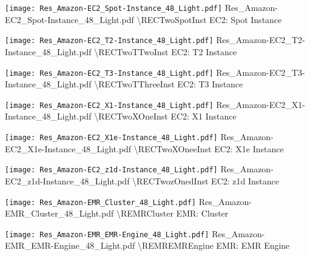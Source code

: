  {\texttt{[image: Res\_Amazon-EC2\_Spot-Instance\_48\_Light.pdf]}} {Res\_Amazon-EC2\_Spot-Instance\_48\_Light.pdf} {{\textbackslash}RECTwoSpotInst} {EC2: Spot Instance}

 {\texttt{[image: Res\_Amazon-EC2\_T2-Instance\_48\_Light.pdf]}} {Res\_Amazon-EC2\_T2-Instance\_48\_Light.pdf} {{\textbackslash}RECTwoTTwoInst} {EC2: T2 Instance}

 {\texttt{[image: Res\_Amazon-EC2\_T3-Instance\_48\_Light.pdf]}} {Res\_Amazon-EC2\_T3-Instance\_48\_Light.pdf} {{\textbackslash}RECTwoTThreeInst} {EC2: T3 Instance}

 {\texttt{[image: Res\_Amazon-EC2\_X1-Instance\_48\_Light.pdf]}} {Res\_Amazon-EC2\_X1-Instance\_48\_Light.pdf} {{\textbackslash}RECTwoXOneInst} {EC2: X1 Instance}

 {\texttt{[image: Res\_Amazon-EC2\_X1e-Instance\_48\_Light.pdf]}} {Res\_Amazon-EC2\_X1e-Instance\_48\_Light.pdf} {{\textbackslash}RECTwoXOneeInst} {EC2: X1e Instance}

 {\texttt{[image: Res\_Amazon-EC2\_z1d-Instance\_48\_Light.pdf]}} {Res\_Amazon-EC2\_z1d-Instance\_48\_Light.pdf} {{\textbackslash}RECTwozOnedInst} {EC2: z1d Instance}

 {\texttt{[image: Res\_Amazon-EMR\_Cluster\_48\_Light.pdf]}} {Res\_Amazon-EMR\_Cluster\_48\_Light.pdf} {{\textbackslash}REMRCluster} {EMR: Cluster}

 {\texttt{[image: Res\_Amazon-EMR\_EMR-Engine\_48\_Light.pdf]}} {Res\_Amazon-EMR\_EMR-Engine\_48\_Light.pdf} {{\textbackslash}REMREMREngine} {EMR: EMR Engine}

